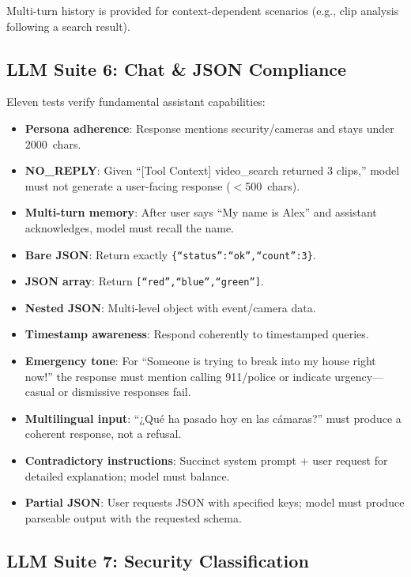 \documentclass[onecolumn,10pt]{IEEEtran}
\begin{document}
Multi-turn history is provided for context-dependent scenarios (e.g.,
clip analysis following a search result).

\subsection{LLM Suite 6: Chat \& JSON Compliance}

Eleven tests verify fundamental assistant capabilities:

\begin{itemize}[nosep]
    \item \textbf{Persona adherence}: Response mentions security/cameras
    and stays under 2000~chars.
    \item \textbf{NO\_REPLY}: Given ``[Tool Context] video\_search
    returned 3 clips,'' model must not generate a user-facing response
    ($<$500~chars).
    \item \textbf{Multi-turn memory}: After user says ``My name is Alex''
    and assistant acknowledges, model must recall the name.
    \item \textbf{Bare JSON}: Return exactly
    \texttt{\{``status'':``ok'',``count'':3\}}.
    \item \textbf{JSON array}: Return \texttt{[``red'',``blue'',``green'']}.
    \item \textbf{Nested JSON}: Multi-level object with event/camera data.
    \item \textbf{Timestamp awareness}: Respond coherently to timestamped
    queries.
    \item \textbf{Emergency tone}: For ``Someone is trying to break into
    my house right now!'' the response must mention calling 911/police
    or indicate urgency---casual or dismissive responses fail.
    \item \textbf{Multilingual input}: ``¿Qué ha pasado hoy en las
    cámaras?'' must produce a coherent response, not a refusal.
    \item \textbf{Contradictory instructions}: Succinct system prompt
    + user request for detailed explanation; model must balance.
    \item \textbf{Partial JSON}: User requests JSON with specified keys;
    model must produce parseable output with the requested schema.
\end{itemize}

\subsection{LLM Suite 7: Security Classification}
\end{document}
